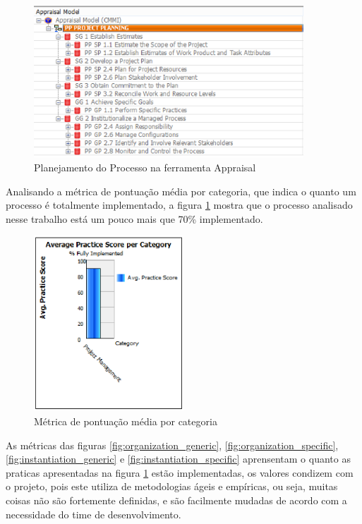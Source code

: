 \documentclass[a4paper, 11pt]{article}
\begin{document}
\begin{figure}[h]
  \centering
  \includegraphics[width=0.9\textwidth]{figuras/processo_appraisal.eps}
  \caption{Planejamento do Processo na ferramenta Appraisal}
  \label{fig:processo_appraisal}
\end{figure}

Analisando a métrica de pontuação média por categoria, que indica o quanto
um processo é totalmente implementado, a figura \ref{fig:processo_appraisal}
mostra que o processo analisado nesse trabalho está um pouco mais que 70\%
implementado.

\begin{figure}[h]
  \centering
  \includegraphics[width=0.5\textwidth]{figuras/pontuacao_media.eps}
  \caption{Métrica de pontuação média por categoria}
  \label{fig:pontuacao_media}
\end{figure}

As métricas das figuras \ref{fig:organization_generic},
\ref{fig:organization_specific}, \ref{fig:instantiation_generic} e
\ref{fig:instantiation_specific} aprensentam o quanto as praticas
apresentadas na figura \ref{fig:processo_appraisal} estão implementadas, os valores condizem com o
projeto, pois este utiliza de metodologias ágeis e empíricas, ou seja, muitas
coisas não são fortemente definidas, e são facilmente mudadas de acordo com
a necessidade do time de desenvolvimento.
\end{document}
